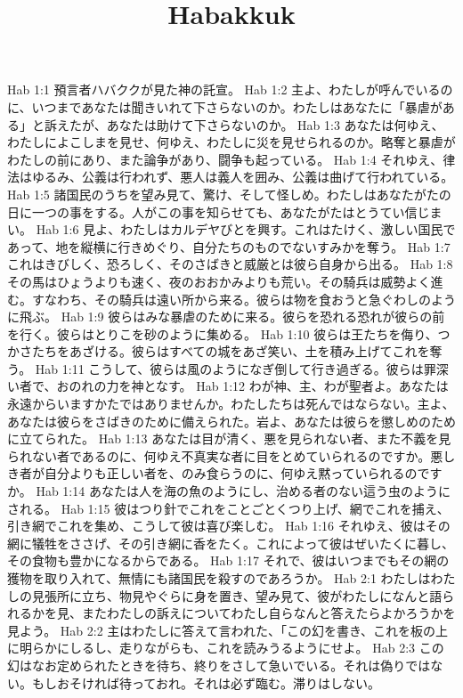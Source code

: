 

\title{Habakkuk}

Hab 1:1  預言者ハバククが見た神の託宣。
Hab 1:2  主よ、わたしが呼んでいるのに、いつまであなたは聞きいれて下さらないのか。わたしはあなたに「暴虐がある」と訴えたが、あなたは助けて下さらないのか。
Hab 1:3  あなたは何ゆえ、わたしによこしまを見せ、何ゆえ、わたしに災を見せられるのか。略奪と暴虐がわたしの前にあり、また論争があり、闘争も起っている。
Hab 1:4  それゆえ、律法はゆるみ、公義は行われず、悪人は義人を囲み、公義は曲げて行われている。
Hab 1:5  諸国民のうちを望み見て、驚け、そして怪しめ。わたしはあなたがたの日に一つの事をする。人がこの事を知らせても、あなたがたはとうてい信じまい。
Hab 1:6  見よ、わたしはカルデヤびとを興す。これはたけく、激しい国民であって、地を縦横に行きめぐり、自分たちのものでないすみかを奪う。
Hab 1:7  これはきびしく、恐ろしく、そのさばきと威厳とは彼ら自身から出る。
Hab 1:8  その馬はひょうよりも速く、夜のおおかみよりも荒い。その騎兵は威勢よく進む。すなわち、その騎兵は遠い所から来る。彼らは物を食おうと急ぐわしのように飛ぶ。
Hab 1:9  彼らはみな暴虐のために来る。彼らを恐れる恐れが彼らの前を行く。彼らはとりこを砂のように集める。
Hab 1:10  彼らは王たちを侮り、つかさたちをあざける。彼らはすべての城をあざ笑い、土を積み上げてこれを奪う。
Hab 1:11  こうして、彼らは風のようになぎ倒して行き過ぎる。彼らは罪深い者で、おのれの力を神となす。
Hab 1:12  わが神、主、わが聖者よ。あなたは永遠からいますかたではありませんか。わたしたちは死んではならない。主よ、あなたは彼らをさばきのために備えられた。岩よ、あなたは彼らを懲しめのために立てられた。
Hab 1:13  あなたは目が清く、悪を見られない者、また不義を見られない者であるのに、何ゆえ不真実な者に目をとめていられるのですか。悪しき者が自分よりも正しい者を、のみ食らうのに、何ゆえ黙っていられるのですか。
Hab 1:14  あなたは人を海の魚のようにし、治める者のない這う虫のようにされる。
Hab 1:15  彼はつり針でこれをことごとくつり上げ、網でこれを捕え、引き網でこれを集め、こうして彼は喜び楽しむ。
Hab 1:16  それゆえ、彼はその網に犠牲をささげ、その引き網に香をたく。これによって彼はぜいたくに暮し、その食物も豊かになるからである。
Hab 1:17  それで、彼はいつまでもその網の獲物を取り入れて、無情にも諸国民を殺すのであろうか。
Hab 2:1  わたしはわたしの見張所に立ち、物見やぐらに身を置き、望み見て、彼がわたしになんと語られるかを見、またわたしの訴えについてわたし自らなんと答えたらよかろうかを見よう。
Hab 2:2  主はわたしに答えて言われた、「この幻を書き、これを板の上に明らかにしるし、走りながらも、これを読みうるようにせよ。
Hab 2:3  この幻はなお定められたときを待ち、終りをさして急いでいる。それは偽りではない。もしおそければ待っておれ。それは必ず臨む。滞りはしない。
